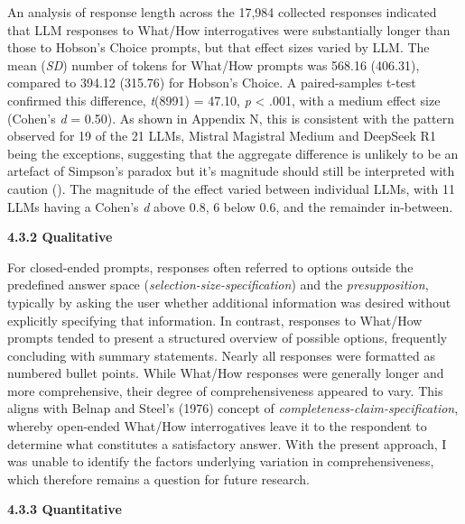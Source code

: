 \documentclass[
  12pt,
]{article}
\begin{document}
An analysis of response length across the 17,984 collected responses indicated that LLM responses to What/How interrogatives were substantially longer than those to Hobson's Choice prompts, but that effect sizes varied by LLM. The mean (\emph{SD}) number of tokens for What/How prompts was 568.16 (406.31), compared to 394.12 (315.76) for Hobson's Choice. A paired-samples t-test confirmed this difference, \emph{t}(8991) = 47.10, \emph{p} \textless{} .001, with a medium effect size (Cohen's \emph{d} = 0.50). As shown in Appendix N, this is consistent with the pattern observed for 19 of the 21 LLMs, Mistral Magistral Medium and DeepSeek R1 being the exceptions, suggesting that the aggregate difference is unlikely to be an artefact of Simpson's paradox but it's magnitude should still be interpreted with caution (). The magnitude of the effect varied between individual LLMs, with 11 LLMs having a Cohen's \emph{d} above 0.8, 6 below 0.6, and the remainder in-between.

\textbf{4.3.2 Qualitative}

For closed-ended prompts, responses often referred to options outside the predefined answer space (\emph{selection-size-specification}) and the \emph{presupposition}, typically by asking the user whether additional information was desired without explicitly specifying that information. In contrast, responses to What/How prompts tended to present a structured overview of possible options, frequently concluding with summary statements. Nearly all responses were formatted as numbered bullet points. While What/How responses were generally longer and more comprehensive, their degree of comprehensiveness appeared to vary. This aligns with Belnap and Steel's (1976) concept of \emph{completeness-claim-specification}, whereby open-ended What/How interrogatives leave it to the respondent to determine what constitutes a satisfactory answer. With the present approach, I was unable to identify the factors underlying variation in comprehensiveness, which therefore remains a question for future research.

\textbf{4.3.3 Quantitative}
\end{document}
